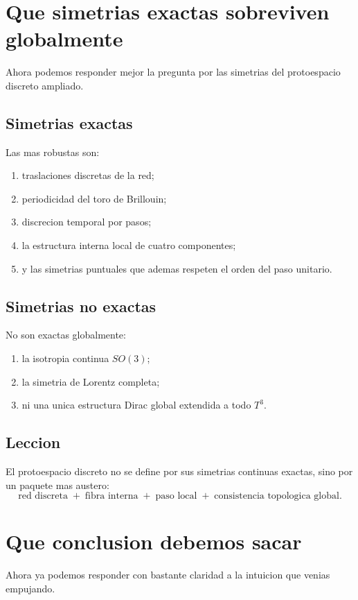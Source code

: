 \section{Que simetrias exactas sobreviven globalmente}
Ahora podemos responder mejor la pregunta por las simetrias del protoespacio discreto ampliado.

\subsection{Simetrias exactas}
Las mas robustas son:
\begin{enumerate}[label=\arabic*.]
    \item traslaciones discretas de la red;
    \item periodicidad del toro de Brillouin;
    \item discrecion temporal por pasos;
    \item la estructura interna local de cuatro componentes;
    \item y las simetrias puntuales que ademas respeten el orden del paso unitario.
\end{enumerate}

\subsection{Simetrias no exactas}
No son exactas globalmente:
\begin{enumerate}[label=\arabic*.]
    \item la isotropia continua \(SO(3)\);
    \item la simetria de Lorentz completa;
    \item ni una unica estructura Dirac global extendida a todo \(T^3\).
\end{enumerate}

\subsection{Leccion}
El protoespacio discreto no se define por sus simetrias continuas exactas, sino por un paquete mas austero:
\begin{equation}
\text{red discreta}
\;+\;
\text{fibra interna}
\;+\;
\text{paso local}
\;+\;
\text{consistencia topologica global}.
\end{equation}

\section{Que conclusion debemos sacar}
Ahora ya podemos responder con bastante claridad a la intuicion que venias empujando.

